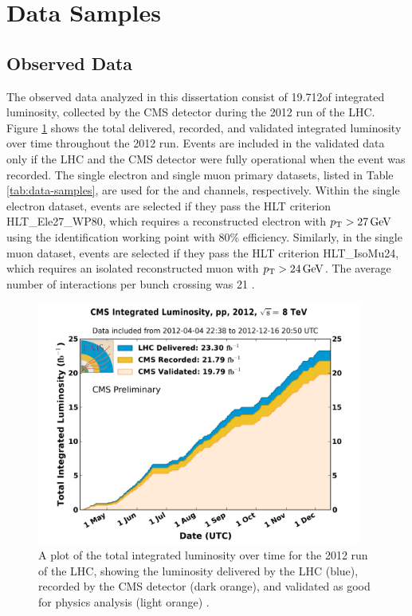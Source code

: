 \section{Data Samples}

\subsection{Observed Data
\label{sec:obsdatasamples}}

The observed data analyzed in this dissertation consist of 19.712\fbinv of integrated luminosity, collected by the CMS detector during the 2012 run of the LHC. Figure \ref{fig:lumipublic-dqm} shows the total delivered, recorded, and validated integrated luminosity over time throughout the 2012 run. Events are included in the validated data only if the LHC and the CMS detector were fully operational when the event was recorded. The single electron and single muon primary datasets, listed in Table \ref{tab:data-samples}, are used for the \etau and \mutau channels, respectively. Within the single electron dataset, events are selected if they pass the HLT criterion HLT\_Ele27\_WP80, which requires a reconstructed electron with $p_{\mathrm{T}}>27\,\text{Ge\hspace{-.08em}V}$ using the identification working point with 80\% efficiency. Similarly, in the single muon dataset, events are selected if they pass the HLT criterion HLT\_IsoMu24, which requires an isolated reconstructed muon with $p_{\mathrm{T}}>24\,\text{Ge\hspace{-.08em}V}$. The average number of interactions per bunch crossing was 21 \cite{LumiPublic}.

\begin{figure}[hbt]
\begin{center}
\includegraphics[width=0.95\textwidth]{figures/int_lumi_per_day_cumulative_pp_2012_SummerConf.png}
\caption{A plot of the total integrated luminosity over time for the 2012 run of the LHC, showing the luminosity delivered by the LHC (blue), recorded by the CMS detector (dark orange), and validated as good for physics analysis (light orange) \cite{DataQuality}.}
\label{fig:lumipublic-dqm}
\end{center}
\end{figure}

